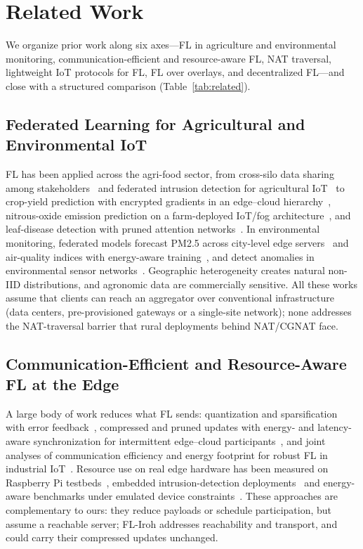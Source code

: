 \documentclass[a4paper,fleqn]{cas-dc}
\begin{document}
\section{Related Work}
\label{sec:related}

We organize prior work along six axes---FL in agriculture and environmental monitoring, communication-efficient and resource-aware FL, NAT traversal, lightweight IoT protocols for FL, FL over overlays, and decentralized FL---and close with a structured comparison (Table~\ref{tab:related}).

\subsection{Federated Learning for Agricultural and Environmental IoT}

FL has been applied across the agri-food sector, from cross-silo data sharing among stakeholders~\cite{durrant2022} and federated intrusion detection for agricultural IoT~\cite{friha2022} to crop-yield prediction with encrypted gradients in an edge--cloud hierarchy~\cite{dey2025}, nitrous-oxide emission prediction on a farm-deployed IoT/fog architecture~\cite{killeen2025}, and leaf-disease detection with pruned attention networks~\cite{piccialli2025}. In environmental monitoring, federated models forecast PM2.5 across city-level edge servers~\cite{hu2024} and air-quality indices with energy-aware training~\cite{dey2026}, and detect anomalies in environmental sensor networks~\cite{yan2024}. Geographic heterogeneity creates natural non-IID distributions, and agronomic data are commercially sensitive. All these works assume that clients can reach an aggregator over conventional infrastructure (data centers, pre-provisioned gateways or a single-site network); none addresses the NAT-traversal barrier that rural deployments behind NAT/CGNAT face.

\subsection{Communication-Efficient and Resource-Aware FL at the Edge}

A large body of work reduces what FL sends: quantization and sparsification with error feedback~\cite{konecny2016,malik2026}, compressed and pruned updates with energy- and latency-aware synchronization for intermittent edge--cloud participants~\cite{bayraktar2026}, and joint analyses of communication efficiency and energy footprint for robust FL in industrial IoT~\cite{barbieri2025}. Resource use on real edge hardware has been measured on Raspberry Pi testbeds~\cite{ridolfi2023}, embedded intrusion-detection deployments~\cite{bhavsar2024} and energy-aware benchmarks under emulated device constraints~\cite{miller2026}. These approaches are complementary to ours: they reduce payloads or schedule participation, but assume a reachable server; FL-Iroh addresses reachability and transport, and could carry their compressed updates unchanged.
\end{document}
